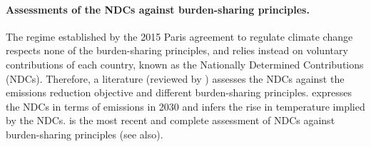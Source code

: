 \paragraph{Assessments of the NDCs against burden-sharing principles.} 
The regime established by the 2015 Paris agreement to regulate climate change respects none of the burden-sharing principles, and relies instead on voluntary contributions of each country, known as the Nationally Determined Contributions (NDCs). Therefore, a literature (reviewed by \citealp{hohne_regional_2014}) assesses the NDCs against the emissions reduction objective and different burden-sharing principles. \citet{gao_sufficient_2019} expresses the NDCs in terms of emissions in 2030 and infers the rise in temperature implied by the NDCs. \citet{van_den_berg_implications_2020} is the most recent and complete assessment of NDCs against burden-sharing principles (see also\citealp{robiou_du_pont_national_2016,robiou_du_pont_equitable_2017,raupach_sharing_2014}). 



